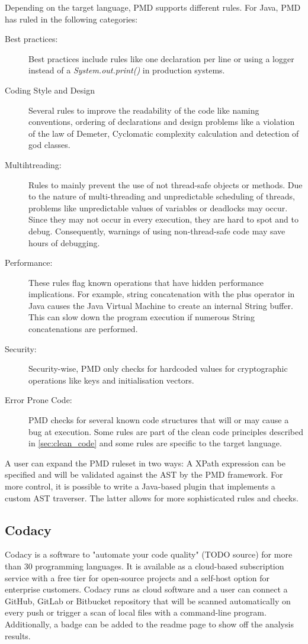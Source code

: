 Depending on the target language, PMD supports different rules. For Java, PMD has ruled in the following categories:
\begin{description}
    \item[Best practices:] Best practices include rules like one declaration per line or using a logger instead of a \textit{System.out.print()} in production systems.  
    \item[Coding Style and Design] Several rules to improve the readability of the code like naming conventions, ordering of declarations and design problems like a violation of the law of Demeter, Cyclomatic complexity calculation and detection of god classes.
    \item[Multihtreading: ]  Rules to mainly prevent the use of not thread-safe objects or methods. Due to the nature of multi-threading and unpredictable scheduling of threads, problems like unpredictable values of variables or deadlocks may occur. Since they may not occur in every execution, they are hard to spot and to debug. Consequently, warnings of using non-thread-safe code may save hours of debugging.
    \item[Performance: ] These rules flag known operations that have hidden performance implications. For example, string concatenation with the plus operator in Java causes the Java Virtual Machine to create an internal String buffer. This can slow down the program execution if numerous String concatenations are performed.
    \item[Security:] Security-wise, PMD only checks for hardcoded values for cryptographic operations like keys and initialisation vectors.
    \item[Error Prone Code: ] PMD checks for several known code structures that will or may cause a bug at execution. Some rules are part of the clean code principles described in \ref{sec:clean_code} and some rules are specific to the target language.
\end{description}

A user can expand the PMD ruleset in two ways: A XPath expression can be specified and will be validated against the AST by the PMD framework. For more control, it is possible to write a Java-based plugin that implements a custom AST traverser. The latter allows for more sophisticated rules and checks.

\subsection{Codacy}
Codacy is a software to "automate your code quality" (TODO source) for more than 30 programming languages. It is available as a cloud-based subscription service with a free tier for open-source projects and a self-host option for enterprise customers.  Codacy runs as cloud software and a user can connect a GitHub, GitLab or Bitbucket repository that will be scanned automatically on every push or trigger a scan of local files with a command-line program. Additionally, a badge can be added to the readme page to show off the analysis results.


